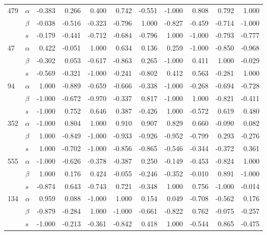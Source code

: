 \begin{longtable}{llrrrrrrrrr}
\cline{1-11}
\multirow{3}{*}{479} & $\alpha$ & -0.383 &  0.266 &  0.400 &  0.742 & -0.551 & -1.000 &  0.808 &  0.792 &  1.000 \\
     & $\beta$ & -0.038 & -0.516 & -0.323 & -0.796 &  1.000 & -0.827 & -0.459 & -0.714 & -1.000 \\
     & $s$ & -0.179 & -0.441 & -0.712 & -0.684 & -0.796 &  1.000 & -1.000 & -0.793 & -0.777 \\
\cline{1-11}
\multirow{3}{*}{47} & $\alpha$ &  0.422 & -0.051 &  1.000 &  0.634 &  0.136 &  0.259 & -1.000 & -0.850 & -0.968 \\
     & $\beta$ & -0.302 &  0.053 & -0.617 & -0.863 &  0.265 & -1.000 &  0.411 &  1.000 & -0.029 \\
     & $s$ & -0.569 & -0.321 & -1.000 & -0.241 & -0.802 &  0.412 &  0.563 & -0.281 &  1.000 \\
\cline{1-11}
\multirow{3}{*}{94} & $\alpha$ &  1.000 & -0.889 & -0.659 & -0.666 & -0.338 & -1.000 & -0.268 & -0.694 & -0.728 \\
     & $\beta$ & -1.000 & -0.672 & -0.970 & -0.337 &  0.817 & -1.000 &  1.000 & -0.821 & -0.411 \\
     & $s$ & -1.000 &  0.752 &  0.646 &  0.387 & -0.426 &  1.000 & -0.572 &  0.619 &  0.480 \\
\cline{1-11}
\multirow{3}{*}{352} & $\alpha$ & -1.000 &  0.804 &  1.000 &  0.910 &  0.907 &  0.829 &  0.660 & -0.090 &  0.082 \\
     & $\beta$ &  1.000 & -0.849 & -1.000 & -0.933 & -0.926 & -0.952 & -0.799 &  0.293 & -0.276 \\
     & $s$ &  1.000 & -0.702 & -1.000 & -0.856 & -0.865 & -0.546 & -0.344 & -0.372 &  0.361 \\
\cline{1-11}
\multirow{3}{*}{555} & $\alpha$ & -1.000 & -0.626 & -0.378 & -0.387 &  0.250 & -0.149 & -0.453 & -0.824 &  1.000 \\
     & $\beta$ &  1.000 &  0.176 &  0.424 & -0.055 & -0.246 & -0.352 & -0.010 &  0.891 & -1.000 \\
     & $s$ & -0.874 &  0.643 & -0.743 &  0.721 & -0.348 &  1.000 &  0.756 & -1.000 & -0.014 \\
\cline{1-11}
\multirow{3}{*}{134} & $\alpha$ &  0.959 &  0.088 & -1.000 &  1.000 &  0.154 &  0.049 & -0.708 & -0.562 &  0.176 \\
     & $\beta$ & -0.879 & -0.284 &  1.000 & -1.000 & -0.661 & -0.822 &  0.762 & -0.075 & -0.257 \\
     & $s$ & -1.000 & -0.213 & -0.361 & -0.842 &  0.418 &  1.000 & -0.544 &  0.865 & -0.475 \\

\end{longtable}
